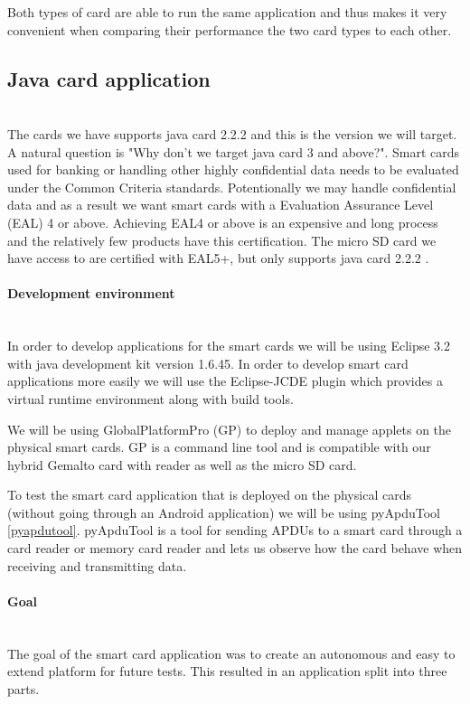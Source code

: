 Both types of card are able to run the same application and thus makes it very convenient when comparing their performance the two card types to each other.

\subsection{Java card application}\mbox{}\\
The cards we have supports java card 2.2.2 and this is the version we will target. A natural question is "Why don't we target java card 3 and above?". Smart cards used for banking or handling other highly confidential data needs to be evaluated under the Common Criteria \cite{commoncriteria} standards. Potentionally we may handle confidential data and as a result we want smart cards with a Evaluation Assurance Level (EAL) 4 or above. Achieving EAL4 or above is an expensive and long process and the relatively few products have this certification. The micro SD card we have access to are certified with EAL5+, but only supports java card 2.2.2 \cite{gemaltoidgo8030}.

\paragraph{Development environment}\mbox{}\\
In order to develop applications for the smart cards we will be using Eclipse 3.2 with java development kit version 1.6.45. In order to develop smart card applications more easily we will use the Eclipse-JCDE plugin \cite{eclipseJCDE} which provides a virtual runtime environment along with build tools.

We will be using GlobalPlatformPro (GP) \cite{globalplatform} to deploy and manage applets on the physical smart cards. GP is a command line tool and is compatible with our hybrid Gemalto card with reader as well as the micro SD card.

To test the smart card application that is deployed on the physical cards (without going through an Android application) we will be using pyApduTool \ref{pyapdutool}. pyApduTool is a tool for sending APDUs to a smart card through a card reader or memory card reader and lets us observe how the card behave when receiving and transmitting data.

\paragraph{Goal}\mbox{}\\
The goal of the smart card application was to create an autonomous and easy to extend platform for future tests. This resulted in an application split into three parts.

